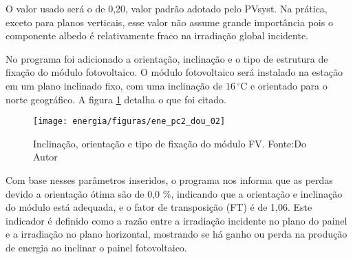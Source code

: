 \begin{table}[]
\caption{Valores usuais para Albedo}
\label{ene_pc2_dou_01_tab}
\end{table}

O valor usado será o de 0,20, valor padrão adotado pelo PVsyst. Na prática, exceto para planos verticais, esse valor não assume grande importância pois o componente albedo é relativamente fraco na irradiação global incidente.

No programa foi adicionado a orientação, inclinação e o tipo de estrutura de fixação do módulo fotovoltaico. O módulo fotovoltaico será instalado na estação em um plano inclinado fixo, com uma inclinação de $16\,^{\circ}\mathrm{C}$ e orientado para o norte geográfico. A figura \ref{ene_pc2_dou_02} detalha o que foi citado. 

\begin{figure}[H]
		\centering
		\texttt{[image: energia/figuras/ene\_pc2\_dou\_02]}
		\caption{Inclinação, orientação e tipo de fixação do módulo FV. Fonte:Do Autor}
		\label{ene_pc2_dou_02}
\end{figure}

Com base nesses parâmetros inseridos, o programa nos informa que as perdas devido a orientação ótima são de 0,0 \%, indicando que a orientação e inclinação do módulo está adequada, e o fator de transposição (FT) é de 1,06. Este indicador é definido como a razão entre a irradiação incidente no plano do painel e a irradiação no plano horizontal, mostrando se há ganho ou perda na produção de energia ao inclinar o painel fotovoltaico.

